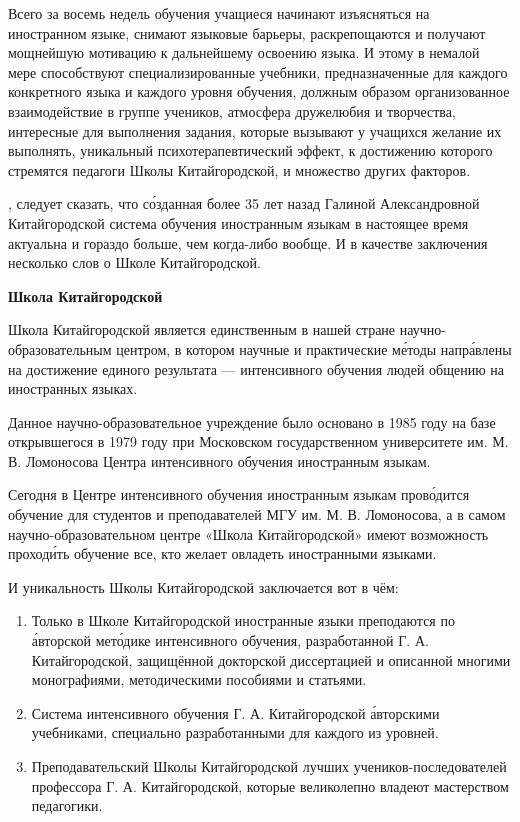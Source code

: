 Всего за восемь недель обучения учащиеся начинают изъясняться на иностранном языке, снимают языковые барьеры, раскрепощаются и получают мощнейшую мотивацию к дальнейшему освоению языка. И этому в немалой мере способствуют специализированные учебники, предназначенные для каждого конкретного языка и каждого уровня обучения, должным образом организованное взаимодействие в группе учеников, атмосфера дружелюбия и творчества, интересные для выполнения задания, которые вызывают у учащихся желание их выполнять, уникальный психотерапевтический эффект, к достижению которого стремятся педагоги Школы Китайгородской, и множество других  факторов.

, следует сказать, что с\'{о}зданная более 35 лет назад Галиной Александровной Китайгородской система обучения иностранным языкам в настоящее время актуальна и  гораздо больше, чем когда-либо вообще. И в качестве заключения несколько слов о Школе Китайгородской.

\textbf{Школа Китайгородской}

Школа Китайгородской является единственным в нашей стране научно-образовательным центром, в котором научные и практические м\'{е}тоды напр\'{а}влены на достижение единого результата --- интенсивного обучения людей общению на иностранных языках.

Данное научно-образовательное учреждение было основано в 1985 году на базе открывшегося в 1979 году при Московском государственном университете им. М. В. Ломоносова Центра интенсивного обучения иностранным языкам.

Сегодня в Центре интенсивного обучения иностранным языкам пров\'{о}дится обучение для студентов и преподавателей МГУ им. М. В. Ломоносова, а в самом научно-образовательном центре «Школа Китайгородской» имеют возможность проход\'{и}ть обучение все, кто желает овладеть иностранными языками.

И уникальность Школы Китайгородской заключается вот в чём:
\begin{enumerate}
    \item Только в Школе Китайгородской иностранные языки преподаются по \'{а}вторской мет\'{о}дике интенсивного обучения, разработанной Г. А. Китайгородской, защищённой докторской диссертацией и описанной многими монографиями, методическими пособиями и статьями.
    \item Система интенсивного обучения Г. А. Китайгородской  \'{а}вторскими учебниками, специально разработанными для каждого из уровней.
    \item Преподавательский  Школы Китайгородской  лучших учеников-последователей профессора Г. А. Китайгородской, которые великолепно владеют мастерством педагогики.
\end{enumerate}

